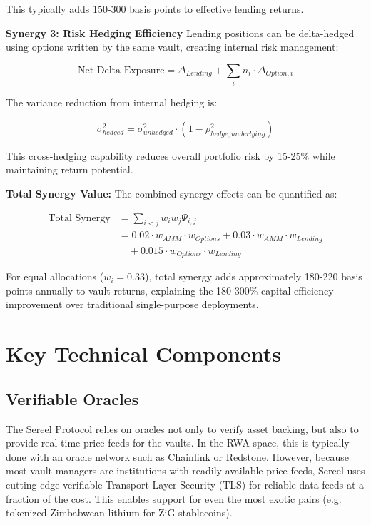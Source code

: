 \documentclass[12pt]{article}
\begin{document}
This typically adds 150-300 basis points to effective lending returns.

\textbf{Synergy 3: Risk Hedging Efficiency}
Lending positions can be delta-hedged using options written by the same vault, creating internal risk management:

\begin{equation}
\text{Net Delta Exposure} = \Delta_{Lending} + \sum_i n_i \cdot \Delta_{Option,i}
\end{equation}

The variance reduction from internal hedging is:

\begin{equation}
\sigma^2_{hedged} = \sigma^2_{unhedged} \cdot \left(1 - \rho^2_{hedge,underlying}\right)
\end{equation}

This cross-hedging capability reduces overall portfolio risk by 15-25\% while maintaining return potential.

\textbf{Total Synergy Value:}
The combined synergy effects can be quantified as:

\begin{equation}
\begin{split}
\text{Total Synergy} &= \sum_{i<j} w_i w_j \Psi_{i,j} \\
&= 0.02 \cdot w_{AMM} \cdot w_{Options} + 0.03 \cdot w_{AMM} \cdot w_{Lending} \\
&\quad + 0.015 \cdot w_{Options} \cdot w_{Lending}
\end{split}
\end{equation}

For equal allocations ($w_i = 0.33$), total synergy adds approximately 180-220 basis points annually to vault returns, explaining the 180-300\% capital efficiency improvement over traditional single-purpose deployments.

\section{Key Technical Components}

\subsection{Verifiable Oracles}
The Sereel Protocol relies on oracles not only to verify asset backing, but also to provide real-time price feeds for the vaults. In the RWA space, this is typically done with an oracle network such as Chainlink or Redstone. However, because most vault managers are institutions with readily-available price feeds, Sereel uses cutting-edge verifiable Transport Layer Security (TLS) for reliable data feeds at a fraction of the cost. This enables support for even the most exotic pairs (e.g. tokenized Zimbabwean lithium for ZiG stablecoins).
\end{document}
